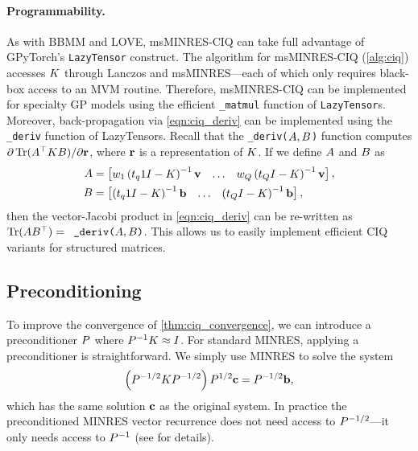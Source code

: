 \paragraph{Programmability.}
As with BBMM and LOVE, msMINRES-CIQ can take full advantage of GPyTorch's {\tt LazyTensor} construct.
The algorithm for msMINRES-CIQ (\cref{alg:ciq}) accesses $K$ through Lanczos and msMINRES---each of which only requires black-box access to an MVM routine.
Therefore, msMINRES-CIQ can be implemented for specialty GP models using the efficient {\tt \_matmul} function of {\tt LazyTensor}s.
Moreover, back-propagation via \cref{eqn:ciq_deriv} can be implemented using the {\tt \_deriv} function of LazyTensors.
Recall that the {\tt \_deriv($ A, B $)} function computes $\partial \tr{ \bA^\top \bK \bB }/{\partial \br}$, where $\mathbf{r}$ is a representation of $K$.
If we define $A$ and $B$ as
%
\begin{align*}
  A &= \begin{bmatrix}
    w_1 \left( t_q1I - K \right)^{-1} \mathbf{v}
    & \ldots &
    w_Q \left( t_Q I - K \right)^{-1} \mathbf{v}
  \end{bmatrix},
  \\
  B &= \begin{bmatrix}
    \left( t_q1I - K \right)^{-1} \mathbf{b}
    & \ldots &
    \left( t_Q I - K \right)^{-1} \mathbf{b}
  \end{bmatrix},
\end{align*}
%
then the vector-Jacobi product in \cref{eqn:ciq_deriv} can be re-written as $\tr{ \bA \bB^\top } = \texttt{ \_deriv($\bA, \bB$)}$.
This allows us to easily implement efficient CIQ variants for structured matrices.


\subsection{Preconditioning}
\label{sec:ciq_precond}

To improve the convergence of \cref{thm:ciq_convergence}, we can introduce a preconditioner $P$ where $P^{-1} K \approx I$.
For standard MINRES, applying a preconditioner is straightforward.
We simply use MINRES to solve the system
\[
  \left( P^{-1/2} K P^{-1/2} \right) P^{1/2} \mathbf{c} = P^{-1/2} \mathbf{b},
\]
which has the same solution $\mathbf{c}$ as the original system.
In practice the preconditioned MINRES vector recurrence does not need access to $P^{-1/2}$---it only needs access to $P^{-1}$
(see \citep[][Ch. 3.4]{choi2006iterative} for details).

